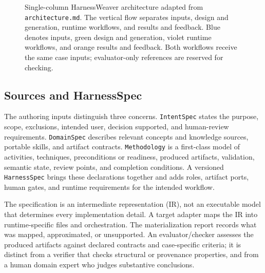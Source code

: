 \documentclass[10pt,conference]{IEEEtran}
\begin{document}
\begin{figure}[t]
{%
}
\caption{Single-column HarnessWeaver architecture adapted from \texttt{architecture.md}. The vertical flow separates inputs, design and generation, runtime workflows, and results and feedback. Blue denotes inputs, green design and generation, violet runtime workflows, and orange results and feedback. Both workflows receive the same case inputs; evaluator-only references are reserved for checking.}
\label{fig:harnessweaver}
\end{figure}

\subsection{Sources and HarnessSpec}

The authoring inputs distinguish three concerns. \texttt{IntentSpec} states the purpose, scope, exclusions, intended user, decision supported, and human-review requirements. \texttt{DomainSpec} describes relevant concepts and knowledge sources, portable skills, and artifact contracts. \texttt{Methodology} is a first-class model of activities, techniques, preconditions or readiness, produced artifacts, validation, semantic state, review points, and completion conditions. A versioned \texttt{HarnessSpec} brings these declarations together and adds roles, artifact ports, human gates, and runtime requirements for the intended workflow.

The specification is an intermediate representation (IR), not an executable model that determines every implementation detail. A target adapter maps the IR into runtime-specific files and orchestration. The materialization report records what was mapped, approximated, or unsupported. An evaluator/checker assesses the produced artifacts against declared contracts and case-specific criteria; it is distinct from a verifier that checks structural or provenance properties, and from a human domain expert who judges substantive conclusions.
\end{document}
